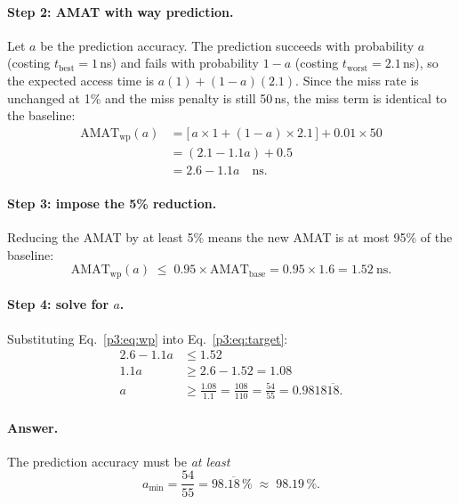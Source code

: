 \paragraph{Step 2: AMAT with way prediction.}
Let $a$ be the prediction accuracy. The prediction succeeds with probability $a$
(costing $t_{\text{best}} = 1$\,ns) and fails with probability $1-a$ (costing
$t_{\text{worst}} = 2.1$\,ns), so the expected access time is
$a(1) + (1-a)(2.1)$. Since the miss rate is unchanged at 1\% and the miss penalty is
still 50\,ns, the miss term is identical to the baseline:
\begin{align}
  \label{p3:eq:wp}
  \mathrm{AMAT}_{\text{wp}}(a)
    &= \bigl[\, a \times 1 + (1-a) \times 2.1 \,\bigr] + 0.01 \times 50 \nonumber \\
    &= (2.1 - 1.1a) + 0.5 \nonumber \\
    &= 2.6 - 1.1a \quad \mathrm{ns}.
\end{align}

\paragraph{Step 3: impose the 5\% reduction.}
Reducing the AMAT by at least 5\% means the new AMAT is at most 95\% of the baseline:
\begin{equation}
  \label{p3:eq:target}
  \mathrm{AMAT}_{\text{wp}}(a) \;\le\; 0.95 \times \mathrm{AMAT}_{\text{base}}
  = 0.95 \times 1.6 = 1.52\ \mathrm{ns}.
\end{equation}

\paragraph{Step 4: solve for $a$.}
Substituting Eq.~\eqref{p3:eq:wp} into Eq.~\eqref{p3:eq:target}:
\begin{align}
  2.6 - 1.1a &\le 1.52 \nonumber \\
  1.1a       &\ge 2.6 - 1.52 = 1.08 \nonumber \\
  a          &\ge \frac{1.08}{1.1} = \frac{108}{110} = \frac{54}{55}
                = 0.9818\overline{18}.
  \label{p3:eq:solve}
\end{align}

\paragraph{Answer.}
The prediction accuracy must be \emph{at least}
\begin{equation}
  \label{p3:eq:amin}
  a_{\min} = \frac{54}{55} = 98.\overline{18}\,\% \;\approx\; \mathbf{98.19\,\%}.
\end{equation}

